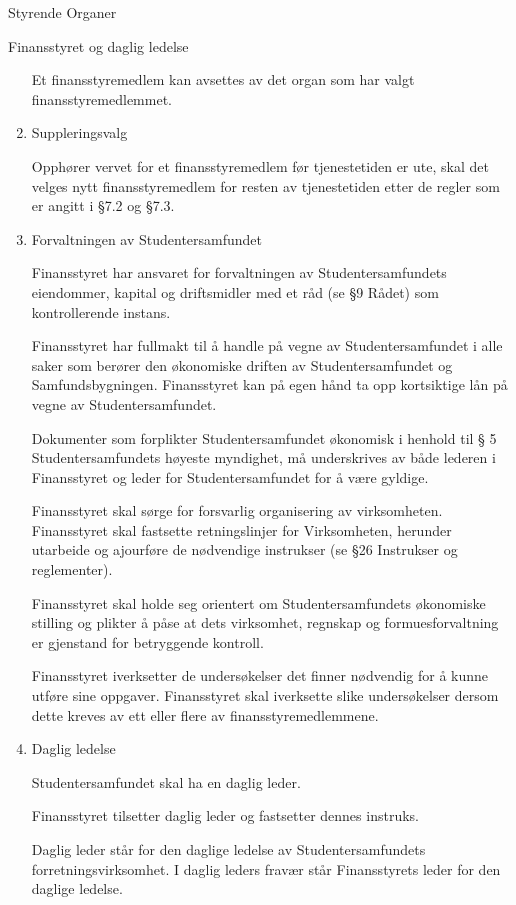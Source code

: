 \documentclass[fsbok.tex]{subfiles}
\begin{document}
\begin{lovkapittel}{Styrende Organer}
\begin{lovparagraf}{Finansstyret og daglig ledelse}
\begin{enumerate}
    Et finansstyremedlem kan avsettes av det organ som har valgt finansstyremedlemmet.
    
    \item Suppleringsvalg
    
    Opphører vervet for et finansstyremedlem før tjenestetiden er ute, skal det velges nytt finansstyremedlem for
    resten av tjenestetiden etter de regler som er angitt i §7.2 og §7.3.
    
    \item Forvaltningen av Studentersamfundet
    
    Finansstyret har ansvaret for forvaltningen av Studentersamfundets eiendommer, kapital og driftsmidler med
    et råd (se §9 Rådet) som kontrollerende instans.
    
    Finansstyret har fullmakt til å handle på vegne av Studentersamfundet i alle saker som berører den
    økonomiske driften av Studentersamfundet og Samfundsbygningen. Finansstyret kan på egen hånd ta opp
    kortsiktige lån på vegne av Studentersamfundet.
    
    Dokumenter som forplikter Studentersamfundet økonomisk i henhold til § 5 Studentersamfundets høyeste
    myndighet, må underskrives av både lederen i Finansstyret og leder for Studentersamfundet for å være gyldige.
    
    Finansstyret skal sørge for forsvarlig organisering av virksomheten. Finansstyret skal fastsette retningslinjer
    for Virksomheten, herunder utarbeide og ajourføre de nødvendige instrukser (se §26 Instrukser og reglementer).
      
    Finansstyret skal holde seg orientert om Studentersamfundets økonomiske stilling og plikter å påse at dets
    virksomhet, regnskap og formuesforvaltning er gjenstand for betryggende kontroll.
    
    Finansstyret iverksetter de undersøkelser det finner nødvendig for å kunne utføre sine oppgaver. Finansstyret
    skal iverksette slike undersøkelser dersom dette kreves av ett eller flere av finansstyremedlemmene.
    
    \item Daglig ledelse
    
    Studentersamfundet skal ha en daglig leder.
    
    Finansstyret tilsetter daglig leder og fastsetter dennes instruks.
    
    Daglig leder står for den daglige ledelse av Studentersamfundets forretningsvirksomhet. I daglig leders
    fravær står Finansstyrets leder for den daglige ledelse.
    

\end{enumerate}
\end{lovparagraf}
\end{lovkapittel}
\end{document}
